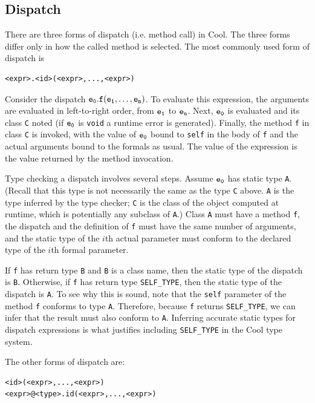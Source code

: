 \documentclass[]{article}
\begin{document}
\subsection{Dispatch}

There are three forms of dispatch (i.e. method call) in Cool. The three
forms differ only in how the called method is selected. The most
commonly used form of dispatch is

\begin{verbatim}
<expr>.<id>(<expr>,...,<expr>)
\end{verbatim}

Consider the dispatch $\tt e_0.f(e_1,\ldots,e_n)$. To evaluate this
expression, the arguments are evaluated in left-to-right order, from
$\tt e_1$ to $\tt e_n$. Next, $\tt e_0$ is evaluated and its class
\texttt{C} noted (if $\tt e_0$ is \texttt{void} a runtime error is
generated). Finally, the method \texttt{f} in class \texttt{C} is
invoked, with the value of $\tt e_0$ bound to \texttt{self} in the body
of \texttt{f} and the actual arguments bound to the formals as usual.
The value of the expression is the value returned by the method
invocation.

Type checking a dispatch involves several steps. Assume $\tt e_0$ has
static type \texttt{A}. (Recall that this type is not necessarily the
same as the type \texttt{C} above. \texttt{A} is the type inferred by
the type checker; \texttt{C} is the class of the object computed at
runtime, which is potentially any subclass of \texttt{A}.) Class
\texttt{A} must have a method \texttt{f}, the dispatch and the
definition of \texttt{f} must have the same number of arguments, and the
static type of the $i$th actual parameter must conform to the declared
type of the $i$th formal parameter.

If \texttt{f} has return type \texttt{B} and \texttt{B} is a class name,
then the static type of the dispatch is \texttt{B}. Otherwise, if
\texttt{f} has return type \texttt{SELF\_TYPE}, then the static type of
the dispatch is \texttt{A}. To see why this is sound, note that the
\texttt{self} parameter of the method \texttt{f} conforms to type
\texttt{A}. Therefore, because \texttt{f} returns \texttt{SELF\_TYPE},
we can infer that the result must also conform to \texttt{A}. Inferring
accurate static types for dispatch expressions is what justifies
including \texttt{SELF\_TYPE} in the Cool type system.

The other forms of dispatch are:

\begin{verbatim}
<id>(<expr>,...,<expr>)
<expr>@<type>.id(<expr>,...,<expr>)
\end{verbatim}
\end{document}
